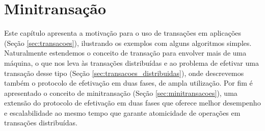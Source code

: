 \documentclass[11pt,twoside,a4paper]{book}
\begin{document}



\chapter{Minitransação}
\label{chap:minitransacao}
Este capítulo apresenta a motivação para o uso de transações em aplicações (Seção \ref{sec:transacoes}), ilustrando os exemplos com alguns algoritmos simples. Naturalmente estendemos o conceito de transação para envolver mais de uma máquina, o que nos leva às transações distribuídas e ao problema de efetivar uma transação desse tipo (Seção \ref{sec:transacoes_distribuidas}), onde descrevemos também o protocolo de efetivação em duas fases, de ampla utilização. Por fim é apresentado o conceito de minitransação (Seção \ref{sec:minitransacoes}), uma extensão do protocolo de efetivação em duas fases que oferece melhor desempenho e escalabilidade ao mesmo tempo que garante atomicidade de operações
em transações distribuídas.


\end{document}
